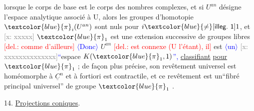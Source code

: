 \documentclass[11pt]{article}
\newcommand{\scanpage}[1]{\par\bigskip\noindent{\small\sffamily[scan #1]}\par}
\newcommand{\mspage}[1]{{\small\sffamily[p.\,#1]}}
\newcommand{\hand}[1]{\textcolor{blue}{#1}}
\let\over\relax
\newcommand{\over}[2]{\textcolor{gray}{#1}\textcolor{blue}{\ensuremath{^{\!\nearrow}}#2}}
\newcommand{\inserted}[2][]{\textcolor{blue}{$\langle$#2$\rangle$}}
\newcommand{\deleted}[1]{\textcolor{red}{[\textsf{del.:} #1]}}
\newcommand{\xout}[1]{\textcolor{gray}{[\textsf{x:} #1]}}
\newcommand{\uline}[1]{\underline{#1}}
\newcommand{\unsure}[1]{[#1?]}
\newcommand{\illegible}[1]{[\textsf{illeg.\ #1}]}
\begin{document}
\clearpage
\scanpage{25/83}
\mspage{\hand{\unsure{78 bis}}}

lorsque le corps de base est le corps des nombres complexes, et si $U^{an}$
désigne l'espace analytique associé à U, alors les groupes  d'homotopie
$\hand{\pi}_i(U^{an})$  sont nuls pour $i\hand{\neq}\over{\illegible{1}}{1}$, et \xout{xxxxx} $\hand{\pi}_1$  est une extension successive
de groupes libres\over{,}{;} \deleted{comme d'ailleurs} \inserted{Donc} $U^{an}$ \deleted{est connexe (U l'étant), il} est
\inserted[typed]{un} \xout{xxxxxxxxxxxxxx}\hand{``}espace $K(\hand{\pi}_1 ,1)$\hand{''}\hand{,} \uline{classifiant}  \uline{pour} $\hand{\pi}_1$ ;  de façon plus
précise, son revêtement universel  est  homéomorphe à $\underline{C}^n$  et à fortiori
est contractile, et ce revêtement est un``fibré principal universel'' de
groupe $\hand{\pi}_1$ .

\mspage{\hand{83}}

\clearpage
\scanpage{25/84}
\mspage{\hand{78}}

14. \uline{Projections coniques}.
\end{document}
